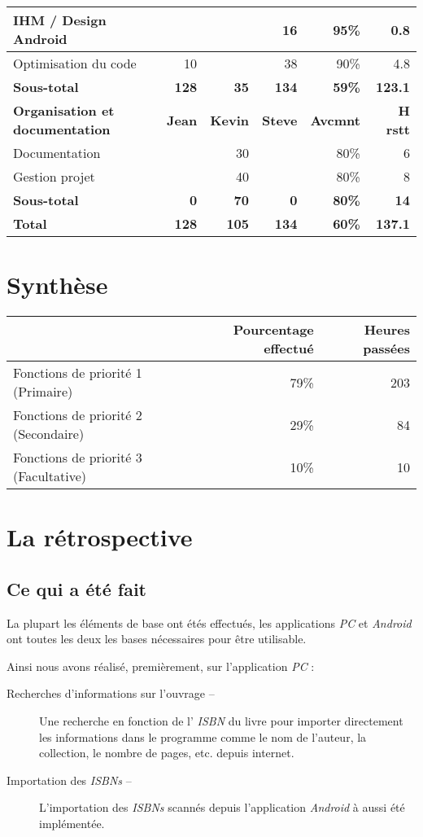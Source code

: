 \documentclass[]{support-iutrs} %
\begin{document}
\begin{tabular}{|l|r|r|r|r|r|}
		  \hline
IHM \slash{} Design Android & & & 16 & 95\% & 0.8 \\
		 \hline
Optimisation du code & 10 & & 38 & 90\% & 4.8 \\
					 \hline
\textbf{Sous-total} & \textbf{128} & \textbf{35} & \textbf{134} & \textbf{59\%} & \textbf{123.1} \\
	\hline
\textbf{Organisation et documentation} & \textbf{Jean} & \textbf{Kevin} & \textbf{Steve} & \textbf{Avcmnt} & \textbf{H rstt} \\
	\hline
Documentation & & 30 & & 80\% & 6 \\
\hline
Gestion projet & & 40 & & 80\% & 8 \\
			  \hline
\textbf{Sous-total} & \textbf{0} & \textbf{70} & \textbf{0} & \textbf{80\%} & \textbf{14} \\
		\hline
\textbf{Total} & \textbf{128} & \textbf{105} & \textbf{134} & \textbf{60\%} & \textbf{137.1} \\
		\hline

\end{tabular} 

\section {Synthèse}

\begin{tabular}{|l|r|r|}
\hline
& Pourcentage effectué & Heures passées \\
		\hline
Fonctions de priorité 1 (Primaire) & 79\% & 203 \\
				 \hline
Fonctions de priorité 2 (Secondaire) & 29\% & 84 \\
				 \hline
Fonctions de priorité 3 (Facultative) & 10\% & 10 \\
				 \hline
\end{tabular} 

\section {La rétrospective}
\subsection{Ce qui a été fait}
La plupart les éléments de base ont étés effectués,
les applications \emph{PC} et \emph{Android} ont toutes les deux les bases nécessaires pour être utilisable. 

Ainsi nous avons réalisé, premièrement, sur l'application \emph{PC} : 
\begin{description}
\item [Recherches d'informations sur l'ouvrage -- ] Une recherche en fonction de l' \emph{ISBN} du livre pour importer directement les informations dans le programme comme le nom de l'auteur, la collection, le nombre de pages, etc. depuis internet. 
\item [Importation des \emph{ISBNs} -- ] L'importation des \emph{ISBNs} scannés depuis l'application \emph{Android} à aussi été implémentée. 
\end{description}
\end{document}
